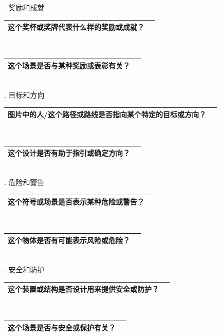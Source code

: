 \documentclass[12pt]{book}
\begin{document}
. 奖励和成就

\begin{tabular}{|p{15cm}|p{3cm}|}
	\hline
这个奖杯或奖牌代表什么样的奖励或成就？\\
	\hline
\end{tabular}\\


\begin{tabular}{|p{15cm}|p{3cm}|}
	\hline
这个场景是否与某种奖励或表彰有关？\\
	\hline
\end{tabular}\\


. 目标和方向

\begin{tabular}{|p{15cm}|p{3cm}|}
	\hline
	图片中的人/这个路径或路线是否指向某个特定的目标或方向？\\
	\hline
\end{tabular}\\


\begin{tabular}{|p{15cm}|p{3cm}|}
	\hline
这个设计是否有助于指引或确定方向？\\
	\hline
\end{tabular}\\


. 危险和警告

\begin{tabular}{|p{15cm}|p{3cm}|}
	\hline
这个符号或场景是否表示某种危险或警告？\\
	\hline
\end{tabular}\\


\begin{tabular}{|p{15cm}|p{3cm}|}
	\hline
这个物体是否有可能表示风险或危险？\\
	\hline
\end{tabular}\\

. 安全和防护

\begin{tabular}{|p{15cm}|p{3cm}|}
	\hline
这个装置或结构是否设计用来提供安全或防护？\\
	\hline
\end{tabular}\\



\begin{tabular}{|p{15cm}|p{3cm}|}
	\hline
这个场景是否与安全或保护有关？\\
	\hline
\end{tabular}\\\\
\end{document}
